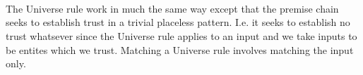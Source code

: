 \begin{code}%
\>[0]\AgdaSpace{}%
\AgdaSpace{}%
\AgdaSymbol{:}\AgdaSpace{}%
\AgdaSpace{}%
\<%
\\
\>[0][@{}l@{\AgdaIndent{0}}]%
\>[2]\<%
\\
\>[2][@{}l@{\AgdaIndent{0}}]%
\>[4]%
\>[14]\AgdaSymbol{:}\AgdaSpace{}%
\AgdaSpace{}%
\<%
\\
%
\>[4]%
\>[14]\AgdaSymbol{:}\AgdaSpace{}%
\AgdaFunction{Σ[}\AgdaSpace{}%
\AgdaSpace{}%
\AgdaSpace{}%
\AgdaSpace{}%
\AgdaSpace{}%
\AgdaFunction{]}\AgdaSpace{}%
\AgdaSpace{}%
\AgdaSymbol{(}\AgdaSpace{}%
\AgdaSymbol{)}\AgdaSpace{}%
\AgdaSpace{}%
\<%
\end{code}
The Universe rule work in much the same way except that the premise
chain seeks to establish trust in a trivial placeless pattern. I.e.
it seeks to establish no trust whatsever since the Universe rule
applies to an input and we take inputs to be entites which we trust.
Matching a Universe rule involves matching the input only.
